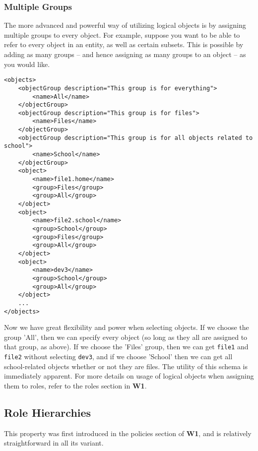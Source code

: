\documentclass{article}
\providecommand{\inlinecode}{\texttt}
\begin{document}
\subsubsection{Multiple Groups}
The more advanced and powerful way of utilizing logical objects is by assigning multiple groups to every object.
For example, suppose you want to be able to refer to every object in an entity, as well as certain subsets.
This is possible by adding as many groups -- and hence assigning as many groups to an object -- as you would like.
\begin{lstlisting}
<objects>
    <objectGroup description="This group is for everything">
        <name>All</name>
    </objectGroup>
    <objectGroup description="This group is for files">
        <name>Files</name>
    </objectGroup>
    <objectGroup description="This group is for all objects related to school">
        <name>School</name>
    </objectGroup>
    <object>
        <name>file1.home</name>
        <group>Files</group>
        <group>All</group>
    </object>
    <object>
        <name>file2.school</name>
        <group>School</group>
        <group>Files</group>
        <group>All</group>
    </object>
    <object>
        <name>dev3</name>
        <group>School</group>
        <group>All</group>
    </object>
    ...
</objects>
\end{lstlisting}
Now we have great flexibility and power when selecting objects. If we choose the group 'All', then we can specify every object (so long as they all are assigned to that group, as above). If we choose the 'Files' group, then we can get \inlinecode{file1} and \inlinecode{file2} without selecting \inlinecode{dev3}, and if we choose 'School' then we can get all school-related objects whether or not they are files.
The utility of this schema is immediately apparent. For more details on usage of logical objects when assigning them to roles, refer to the roles section in \textbf{W1}.

\subsection{Role Hierarchies}
This property was first introduced in the policies section of \textbf{W1}, and is relatively straightforward in all its variant.
\end{document}
